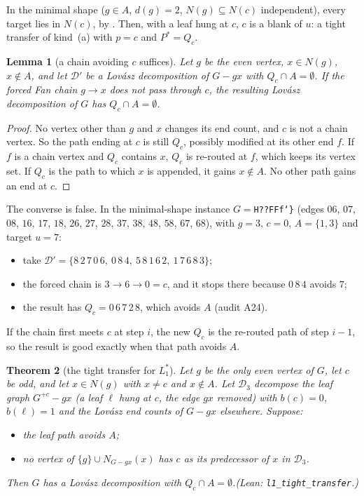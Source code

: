 \documentclass[11pt]{amsart}
\newtheorem{theorem}{Theorem}[section]
\newtheorem{lemma}[theorem]{Lemma}
\theoremstyle{definition}
\newcommand{\cD}{\mathcal D}
\newcommand{\lean}[1]{\quad\emph{(Lean: \texttt{#1}.)}}
\begin{document}
In the minimal shape ($g\in A$, $d(g)=2$, $N(g)\subseteq N(c)$ independent), every target lies in
$N(c)$, by \cite[Corollary~5.6(5)]{L1S}. Then, with a leaf hung at $c$, $c$ is a blank of $u$: a tight
transfer of kind~(a) with $p=c$ and $P^*=Q_c$.

\begin{lemma}[a chain avoiding $c$ suffices]\label{lem:avoidc}
Let $g$ be the even vertex, $x\in N(g)$, $x\notin A$, and let $\cD'$ be a Lov\'asz decomposition of
$G-gx$ with $Q_c\cap A=\emptyset$. If the forced Fan chain $g\to x$ does not pass through $c$, the
resulting Lov\'asz decomposition of $G$ has $Q_c\cap A=\emptyset$.
\end{lemma}

\begin{proof}
No vertex other than $g$ and $x$ changes its end count, and $c$ is not a chain vertex. So the path
ending at $c$ is still $Q_c$, possibly modified at its other end $f$. If $f$ is a chain vertex and
$Q_c$ contains $x$, $Q_c$ is re-routed at $f$, which keeps its vertex set. If $Q_c$ is the path to
which $x$ is appended, it gains $x\notin A$. No other path gains an end at $c$.
\end{proof}

The converse is false. In the minimal-shape instance $G=$\texttt{H??FFf\char`\}} (edges $06$, $07$,
$08$, $16$, $17$, $18$, $26$, $27$, $28$, $37$, $38$, $48$, $58$, $67$, $68$), with $g=3$, $c=0$,
$A=\{1,3\}$ and target $u=7$:
\begin{itemize}
\item take $\cD'=\{8\,2\,7\,0\,6,\ 0\,8\,4,\ 5\,8\,1\,6\,2,\ 1\,7\,6\,8\,3\}$;
\item the forced chain is $3\to6\to0=c$, and it stops there because $0\,8\,4$ avoids $7$;
\item the result has $Q_c=0\,6\,7\,2\,8$, which avoids $A$ (audit A24).
\end{itemize}
If the chain first meets $c$ at step $i$, the new $Q_c$ is the re-routed path of step $i-1$, so the
result is good exactly when that path avoids $A$.

\begin{theorem}[the tight transfer for $L_1^*$]\label{thm:l1tight}
Let $g$ be the only even vertex of $G$, let $c$ be odd, and let $x\in N(g)$ with $x\ne c$ and
$x\notin A$. Let $\cD_3$ decompose the leaf graph $G^{+c}-gx$ (a leaf $\ell$ hung at $c$, the edge
$gx$ removed) with $b(c)=0$, $b(\ell)=1$ and the Lov\'asz end counts of $G-gx$ elsewhere. Suppose:
\begin{itemize}
\item the leaf path avoids $A$;
\item no vertex of $\{g\}\cup N_{G-gx}(x)$ has $c$ as its predecessor of $x$ in $\cD_3$.
\end{itemize}
Then $G$ has a Lov\'asz decomposition with $Q_c\cap A=\emptyset$.\lean{l1\_tight\_transfer}
\end{theorem}
\end{document}
